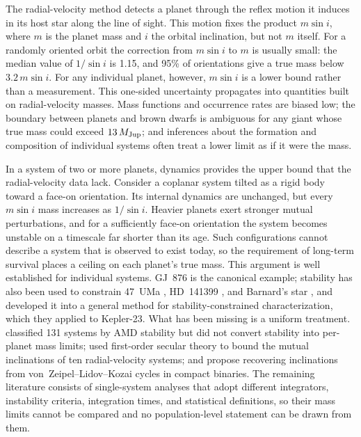 \documentclass[twocolumn]{aastex631}
\newcommand{\msini}{m\sin i}
\newcommand{\mjup}{M_{\rm Jup}}
\begin{document}
The radial-velocity method detects a planet through the reflex motion it
induces in its host star along the line of sight. This motion fixes the
product $\msini$, where $m$ is the planet mass and $i$ the orbital
inclination, but not $m$ itself. For a randomly oriented orbit the
correction from $\msini$ to $m$ is usually small: the median value of
$1/\sin i$ is 1.15, and 95\% of orientations give a true mass below
$3.2\,\msini$. For any individual planet, however, $\msini$ is a lower
bound rather than a measurement. This one-sided uncertainty propagates
into quantities built on radial-velocity masses. Mass functions and
occurrence rates are biased low; the boundary between planets and brown
dwarfs is ambiguous for any giant whose true mass could exceed $13\,\mjup$;
and inferences about the formation and composition of individual systems
often treat a lower limit as if it were the mass.

In a system of two or more planets, dynamics provides the upper bound that
the radial-velocity data lack. Consider a coplanar system tilted as a
rigid body toward a face-on orientation. Its internal dynamics are
unchanged, but every $\msini$ mass increases as $1/\sin i$. Heavier
planets exert stronger mutual perturbations, and for a sufficiently
face-on orientation the system becomes unstable on a timescale far shorter
than its age. Such configurations cannot describe a system that is
observed to exist today, so the requirement of long-term survival places a
ceiling on each planet's true mass. This argument is well established for
individual systems. GJ~876 is the canonical example; stability has also
been used to constrain 47~UMa \citep{Gozdziewski2002}, HD~141399
\citep{Vogt2014}, and Barnard's star \citep{Basant2025}, and
\citet{Tamayo2021} developed it into a general method for
stability-constrained characterization, which they applied to Kepler-23.
What has been missing is a uniform treatment. \citet{LaskarPetit2017}
classified 131 systems by AMD stability but did not convert stability into
per-planet mass limits; \citet{Volpi2019} used first-order secular theory
to bound the mutual inclinations of ten radial-velocity systems; and
\citet{Qin2025} propose recovering inclinations from
von~Zeipel--Lidov--Kozai cycles in compact binaries. The remaining
literature consists of single-system analyses that adopt different
integrators, instability criteria, integration times, and statistical
definitions, so their mass limits cannot be compared and no
population-level statement can be drawn from them.
\end{document}
